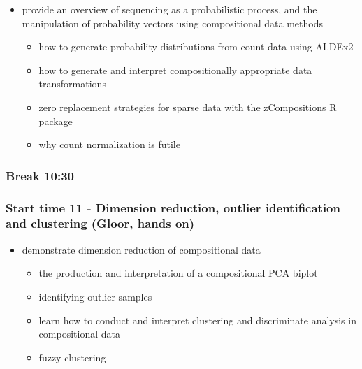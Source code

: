 \documentclass[twocolumn]{article}
\providecommand{\tightlist}{%
  \setlength{\itemsep}{0pt}\setlength{\parskip}{0pt}}
\begin{document}
\begin{itemize}
\tightlist
\item
  provide an overview of sequencing as a probabilistic process, and the
  manipulation of probability vectors using compositional data methods

  \begin{itemize}
  \tightlist
  \item
    how to generate probability distributions from count data using
    ALDEx2
  \item
    how to generate and interpret compositionally appropriate data
    transformations
  \item
    zero replacement strategies for sparse data with the zCompositions R
    package
  \item
    why count normalization is futile
  \end{itemize}
\end{itemize}

\hypertarget{break-1030}{%
\subsubsection{Break 10:30}\label{break-1030}}

\hypertarget{start-time-11---dimension-reduction-outlier-identification-and-clustering-gloor-hands-on}{%
\subsubsection{Start time 11 - Dimension reduction, outlier
identification and clustering (Gloor, hands
on)}\label{start-time-11---dimension-reduction-outlier-identification-and-clustering-gloor-hands-on}}

\begin{itemize}
\tightlist
\item
  demonstrate dimension reduction of compositional data

  \begin{itemize}
  \tightlist
  \item
    the production and interpretation of a compositional PCA biplot
  \item
    identifying outlier samples
  \item
    learn how to conduct and interpret clustering and discriminate
    analysis in compositional data
  \item
    fuzzy clustering
  \end{itemize}
\end{itemize}
\end{document}
